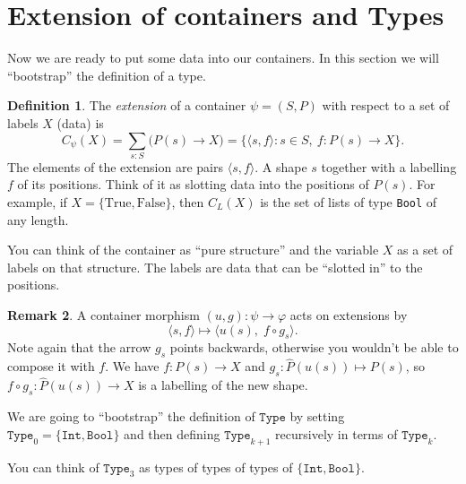 \documentclass[11pt, a4paper]{article}
\theoremstyle{definition}
\newtheorem{definition}{Definition}[section]
\newtheorem{remark}[definition]{Remark}
\theoremstyle{plain}
\begin{document}
\newpage

\section{Extension of containers and Types}\label{sec:extension-types}

Now we are ready to put some data into our containers.  In this
section we will ``bootstrap'' the definition of a type.

\noindent\colorbox{gray!15}{\parbox{\dimexpr\linewidth-2\fboxsep}{%
\begin{definition}\label{def:extension}
The \emph{extension} of a container $\psi = (S, P)$ with respect to a set
of labels $X$ (data) is
\[
  C_\psi(X) = \sum_{s:S}\bigl(P(s) \to X\bigr)
            = \bigl\{\langle s, f \rangle : s \in S,\ f : P(s) \to X\bigr\}.
\]
The elements of the extension are pairs $\langle s, f \rangle$.  A shape $s$
together with a labelling $f$ of its positions.  Think of it
as slotting data into the positions of $P(s)$.
For example, if $X = \{\mathrm{True}, \mathrm{False}\}$, then $C_L(X)$ is the
set of lists of type \texttt{Bool} of any length.
\end{definition}%
}}


You can think of the container as ``pure structure'' and the variable $X$ as
a set of labels on that structure.  The labels are data that can be
``slotted in'' to the positions.


\noindent\colorbox{blue!10}{\parbox{\dimexpr\linewidth-2\fboxsep}{%
\begin{remark}
A container morphism $(u, g) : \psi \to \varphi$ acts on extensions by
\[
  \langle s, f \rangle \longmapsto \langle u(s),\; f \circ g_s \rangle.
\]
Note again that the arrow $g_s$
points backwards, otherwise you wouldn't be able to compose it with $f$.  We
have $f : P(s) \to X$ and $g_s : \hat{P}(u(s)) \mapsto P(s)$, so
$f \circ g_s : \hat{P}(u(s)) \to X$ is a labelling of the new shape.
\end{remark}%
}}

We are going to ``bootstrap'' the definition of $\texttt{Type}$ by
setting $\texttt{Type}_0 = \{\texttt{Int}, \texttt{Bool}\}$ and then
defining $\texttt{Type}_{k+1}$ recursively in terms of
$\texttt{Type}_k$.

You can think of $\texttt{Type}_3$ as types of
types of types of $\{\texttt{Int}, \texttt{Bool}\}$.

\medskip
\end{document}
